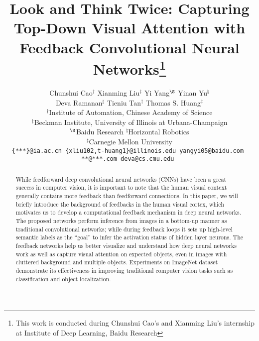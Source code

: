 \documentclass[10pt,twocolumn,letterpaper]{article}
\begin{document}
\title{Look and Think Twice: Capturing Top-Down Visual Attention with Feedback Convolutional Neural Networks\thanks{This work is conducted during Chunshui Cao's and Xianming Liu's internship at Institute of Deep Learning, Baidu Research }}


\author{Chunshui Cao$^\dag$ \;\; Xianming Liu$^\ddag$ \;\; Yi Yang$^\S$ \;\; Yinan Yu$^\natural$ \;\; \\
Deva Ramanan$^\sharp$ \;\; Tieniu Tan$^\dag$ \;\; Thomas S. Huang$^\ddag$ \\
$^\dag$Institute of Automation, Chinese Academy of Science\\
$^\ddag$Beckman Institute, University of Illinois at Urbana-Champaign\\
$^\S$Baidu Research \quad $^\natural$Horizontal Robotics\\
$^\sharp$Carnegie Mellon University \\
{\tt \small \{***\}@ia.ac.cn \;\; \{xliu102,t-huang1\}@illinois.edu \;\; yangyi05@baidu.com \;\;}\\
{\tt \small ***@***.com \;\; deva@cs.cmu.edu }
}

\maketitle


\begin{abstract}
While feedforward deep convolutional neural networks (CNNs) have been a great success in computer vision, it is important to note that the human visual context generally contains more feedback than feedforward connections.
In this paper, we will briefly introduce the background of feedbacks in the human visual cortex, which motivates us to develop a computational feedback mechanism in deep neural networks.
The proposed networks perform inference from images in a bottom-up manner as traditional convolutional networks; while during feedback loops it sets up high-level semantic labels as the “goal” to infer the activation status of hidden layer neurons.
The feedback networks help us better visualize and understand how deep neural networks work as well as capture visual attention on expected objects, even in images with cluttered background and multiple objects.
Experiments on ImageNet dataset demonstrate its effectiveness in improving traditional computer vision tasks such as classification and object localization.
\end{abstract}







{\small


}
\end{document}
